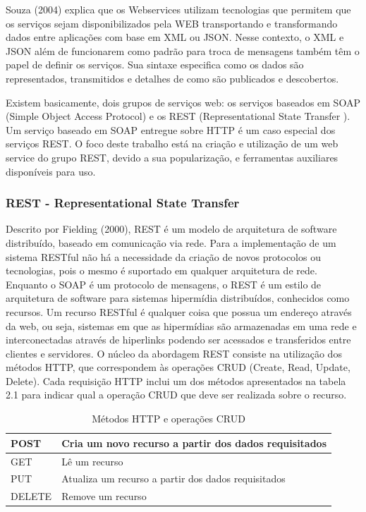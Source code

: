 \documentclass[12pt]{article}
\begin{document}
Souza (2004) explica que os Webservices utilizam tecnologias que permitem que
os serviços sejam disponibilizados pela WEB transportando e transformando dados
entre aplicações com base em XML ou JSON. Nesse contexto, o XML e JSON além de
funcionarem como padrão para troca de mensagens também têm o papel de definir os
serviços. Sua sintaxe especifica como os dados são representados, transmitidos e
detalhes de como são publicados e descobertos.

Existem basicamente, dois grupos de serviços web: os serviços baseados em SOAP (Simple Object Access Protocol) e os REST (Representational
State Transfer ). Um serviço baseado em SOAP entregue sobre HTTP é um caso especial dos serviços REST. O foco deste trabalho está na criação e utilização de um web service do grupo REST, devido a sua popularização, e ferramentas auxiliares disponíveis para uso.

\subsubsection{REST - Representational State Transfer}

Descrito por Fielding (2000), REST é um modelo de arquitetura de software distribuído, baseado em comunicação via rede.
Para a implementação de um sistema RESTful não há a necessidade da criação de novos protocolos ou tecnologias, pois o mesmo é suportado em qualquer arquitetura de rede.
Enquanto o SOAP é um protocolo de mensagens, o REST é um estilo de arquitetura
de software para sistemas hipermídia distribuídos, conhecidos como recursos. Um recurso RESTful é qualquer coisa que possua um endereço através da web, ou seja, sistemas em que as hipermídias são armazenadas em uma rede e interconectadas através de hiperlinks podendo ser acessados e transferidos entre clientes e servidores.
O núcleo da abordagem REST consiste na utilização dos métodos HTTP, que correspondem às operações CRUD (Create, Read, Update, Delete). Cada requisição HTTP inclui um dos métodos apresentados na tabela 2.1 para indicar qual a operação CRUD que deve ser realizada sobre o recurso.
\begin{table}[ht]
	\centering
	\caption{Métodos HTTP e operações CRUD}
	\label{tab:Table1}
	\smallskip
	\begin{tabular}{ |l|l| }
		\hline
		POST & Cria um novo recurso a partir dos dados requisitados \\ \hline
		GET & Lê um recurso \\ \hline
		PUT & Atualiza um recurso a partir dos dados requisitados \\ \hline
		DELETE & Remove um recurso \\
		\hline
	\end{tabular}
\end{table}
\end{document}
